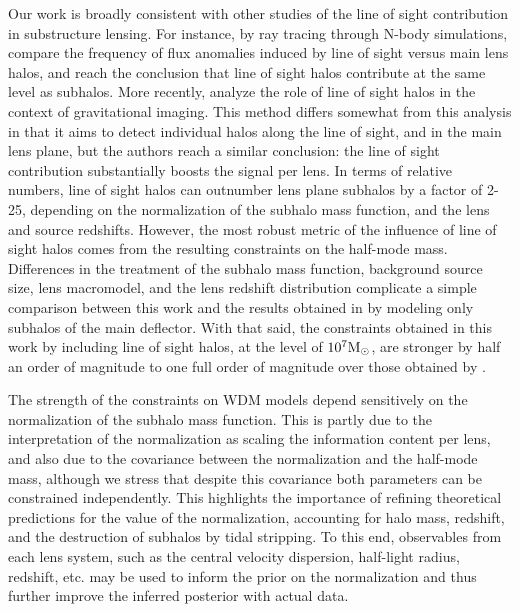 Our work is broadly consistent with other studies of the line of sight contribution in substructure lensing. For instance, by ray tracing through N-body simulations, \citep{Xu++12} compare the frequency of flux anomalies induced by line of sight versus main lens halos, and reach the conclusion that line of sight halos contribute at the same level as subhalos. More recently, \citep{Despali++18} analyze the role of line of sight halos in the context of gravitational imaging. This method differs somewhat from this analysis in that it aims to detect individual halos along the line of sight, and in the main lens plane, but the authors reach a similar conclusion: the line of sight contribution substantially boosts the signal per lens. In terms of relative numbers, line of sight halos can outnumber lens plane subhalos by a factor of 2-25, depending on the normalization of the subhalo mass function, and the lens and source redshifts. However, the most robust metric of the influence of line of sight halos comes from the resulting constraints on the half-mode mass. Differences in the treatment of the subhalo mass function, background source size, lens macromodel, and the lens redshift distribution complicate a simple comparison between this work and the results obtained in \citet{Gilman++18} by modeling only subhalos of the main deflector. With that said, the constraints obtained in this work by including line of sight halos, at the level of $10^{7} {\rm{M}_{\odot}}$, are stronger by half an order of magnitude to one full order of magnitude over those obtained by \citet{Gilman++18}.

The strength of the constraints on WDM models depend sensitively on the normalization of the subhalo mass function. This is partly due to the interpretation of the normalization as scaling the information content per lens, and also due to the covariance between the normalization and the half-mode mass, although we stress that despite this covariance both parameters can be constrained independently. This highlights the importance of refining theoretical predictions for the value of the normalization, accounting for halo mass, redshift, and the destruction of subhalos by tidal stripping. To this end, observables from each lens system, such as the central velocity dispersion, half-light radius, redshift, etc. may be used to inform the prior on the normalization and thus further improve the inferred posterior with actual data. 

